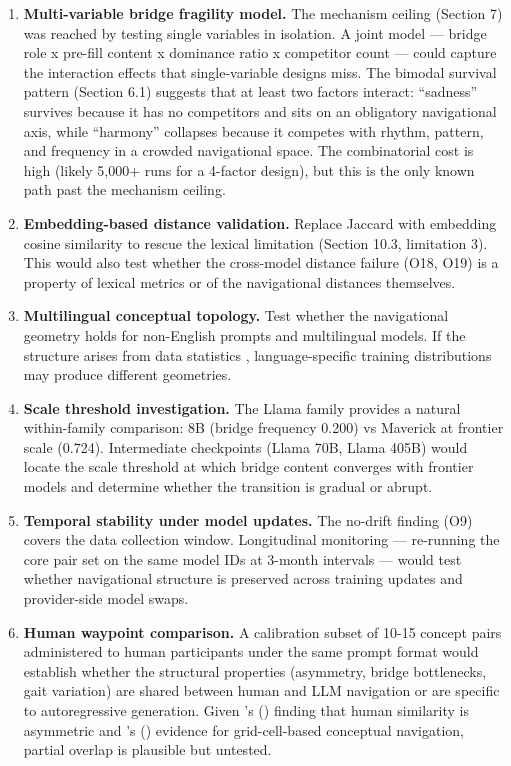 \begin{enumerate}
\def\labelenumi{\arabic{enumi}.}
\item
  \textbf{Multi-variable bridge fragility model.} The mechanism ceiling (Section 7) was reached by testing single variables in isolation. A joint model --- bridge role x pre-fill content x dominance ratio x competitor count --- could capture the interaction effects that single-variable designs miss. The bimodal survival pattern (Section 6.1) suggests that at least two factors interact: ``sadness'' survives because it has no competitors and sits on an obligatory navigational axis, while ``harmony'' collapses because it competes with rhythm, pattern, and frequency in a crowded navigational space. The combinatorial cost is high (likely 5,000+ runs for a 4-factor design), but this is the only known path past the mechanism ceiling.
\item
  \textbf{Embedding-based distance validation.} Replace Jaccard with embedding cosine similarity to rescue the lexical limitation (Section 10.3, limitation 3). This would also test whether the cross-model distance failure (O18, O19) is a property of lexical metrics or of the navigational distances themselves.
\item
  \textbf{Multilingual conceptual topology.} Test whether the navigational geometry holds for non-English prompts and multilingual models. If the structure arises from data statistics \citep{karkada2025translation}, language-specific training distributions may produce different geometries.
\item
  \textbf{Scale threshold investigation.} The Llama family provides a natural within-family comparison: 8B (bridge frequency 0.200) vs Maverick at frontier scale (0.724). Intermediate checkpoints (Llama 70B, Llama 405B) would locate the scale threshold at which bridge content converges with frontier models and determine whether the transition is gradual or abrupt.
\item
  \textbf{Temporal stability under model updates.} The no-drift finding (O9) covers the data collection window. Longitudinal monitoring --- re-running the core pair set on the same model IDs at 3-month intervals --- would test whether navigational structure is preserved across training updates and provider-side model swaps.
\item
  \textbf{Human waypoint comparison.} A calibration subset of 10-15 concept pairs administered to human participants under the same prompt format would establish whether the structural properties (asymmetry, bridge bottlenecks, gait variation) are shared between human and LLM navigation or are specific to autoregressive generation. Given \citeauthor{tversky1977features}'s (\citeyear{tversky1977features}) finding that human similarity is asymmetric and \citeauthor{constantinescu2016grid}'s (\citeyear{constantinescu2016grid}) evidence for grid-cell-based conceptual navigation, partial overlap is plausible but untested.

\end{enumerate}

